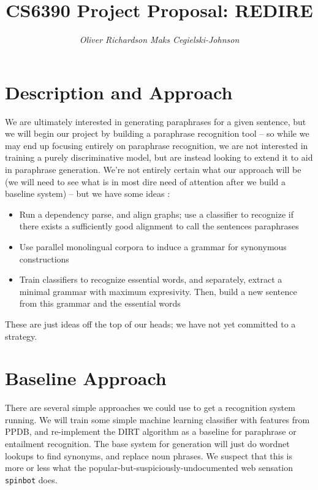 \documentclass[11pt, reqno]{amsart}
\begin{document}
	\title{\LARGE CS6390 Project Proposal: REDIRE}
	\author{\it Oliver Richardson \hspace{2em} Maks Cegielski-Johnson }
	\maketitle 
	
	\vspace{-2em}
	
	\section{Description and Approach}
	We are ultimately interested in generating paraphrases for a given sentence, but we will begin our project by building a paraphrase recognition tool -- so while we may end up focusing entirely on paraphrase recognition, we are not interested in training a purely discriminative model, but are instead looking to extend it to aid in paraphrase generation.	We're not entirely certain what our approach will be (we will need to see what is in most dire need of attention after we build a baseline system)  -- but we have some ideas :
	
	\begin{itemize}
		\item Run a dependency parse, and align graphs; use a classifier to recognize if there exists a sufficiently good alignment to call the sentences paraphrases
		\item Use parallel monolingual corpora to induce a grammar for synonymous constructions
		\item Train classifiers to recognize essential words, and separately, extract a minimal grammar with maximum expresivity. Then, build a new sentence from this grammar and the essential words
	\end{itemize}
	These are just ideas off the top of our heads; we have not yet committed to a strategy.
	
	\section{Baseline Approach}
	There are several simple approaches we could use to get a recognition system running. We will train some simple machine learning classifier with features from PPDB, and re-implement the DIRT algorithm as a baseline for paraphrase or entailment recognition. The base system for generation will just do wordnet lookups to find synonyms, and replace noun phrases.  We suspect that this is more or less what the popular-but-suspiciously-undocumented web sensation \texttt{spinbot} does. 
	
\end{document}
